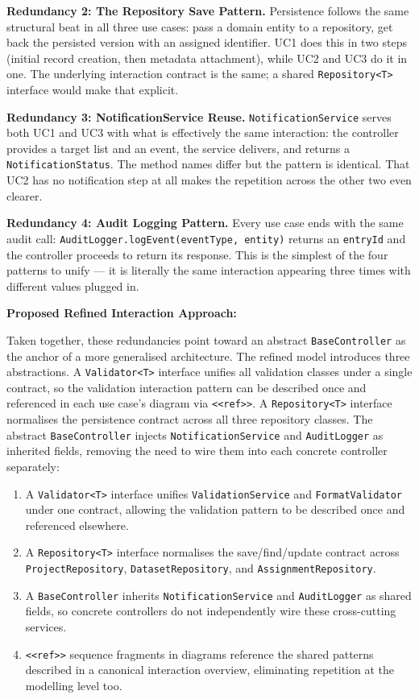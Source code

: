 \documentclass[12pt,a4paper]{article}
\newcommand{\code}[1]{\texttt{\small #1}}
\begin{document}
\noindent\textbf{Redundancy 2: The Repository Save Pattern.}
Persistence follows the same structural beat in all three use cases: pass a domain entity to a repository, get back the persisted version with an assigned identifier. UC1 does this in two steps (initial record creation, then metadata attachment), while UC2 and UC3 do it in one. The underlying interaction contract is the same; a shared \code{Repository<T>} interface would make that explicit.

\noindent\textbf{Redundancy 3: NotificationService Reuse.}
\code{NotificationService} serves both UC1 and UC3 with what is effectively the same interaction: the controller provides a target list and an event, the service delivers, and returns a \code{NotificationStatus}. The method names differ but the pattern is identical. That UC2 has no notification step at all makes the repetition across the other two even clearer.

\noindent\textbf{Redundancy 4: Audit Logging Pattern.}
Every use case ends with the same audit call: \code{AuditLogger.logEvent(eventType, entity)} returns an \code{entryId} and the controller proceeds to return its response. This is the simplest of the four patterns to unify --- it is literally the same interaction appearing three times with different values plugged in.

\noindent\textbf{Proposed Refined Interaction Approach:}

Taken together, these redundancies point toward an abstract \code{BaseController} as the anchor of a more generalised architecture. The refined model introduces three abstractions. A \code{Validator<T>} interface unifies all validation classes under a single contract, so the validation interaction pattern can be described once and referenced in each use case's diagram via \code{<<ref>>}. A \code{Repository<T>} interface normalises the persistence contract across all three repository classes. The abstract \code{BaseController} injects \code{NotificationService} and \code{AuditLogger} as inherited fields, removing the need to wire them into each concrete controller separately:
\begin{enumerate}
  \item A \code{Validator<T>} interface unifies \code{ValidationService} and \code{FormatValidator} under one contract, allowing the validation pattern to be described once and referenced elsewhere.
  \item A \code{Repository<T>} interface normalises the save/find/update contract across \code{ProjectRepository}, \code{DatasetRepository}, and \code{AssignmentRepository}.
  \item A \code{BaseController} inherits \code{NotificationService} and \code{AuditLogger} as shared fields, so concrete controllers do not independently wire these cross-cutting services.
  \item \code{<<ref>>} sequence fragments in diagrams reference the shared patterns described in a canonical interaction overview, eliminating repetition at the modelling level too.
\end{enumerate}
\end{document}
